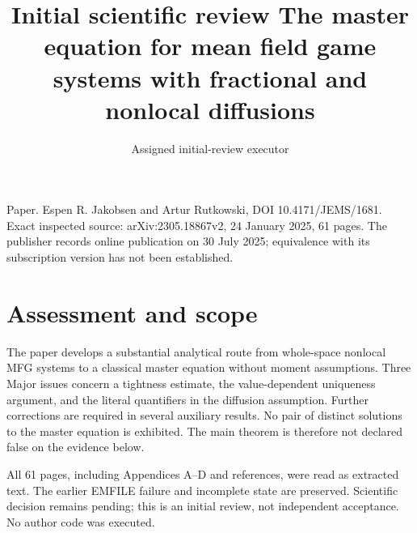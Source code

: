 \documentclass[10pt]{article}
\title{Initial scientific review
The master equation for mean field game systems with fractional and nonlocal diffusions}
\author{Assigned initial-review executor}
\date{}
\begin{document}
\maketitle
Paper. Espen R. Jakobsen and Artur Rutkowski, DOI 10.4171/JEMS/1681. Exact inspected source: arXiv:2305.18867v2, 24 January 2025, 61 pages. The publisher records online publication on 30 July 2025; equivalence with its subscription version has not been established.\par
\section*{Assessment and scope}
The paper develops a substantial analytical route from whole-space nonlocal MFG systems to a classical master equation without moment assumptions. Three Major issues concern a tightness estimate, the value-dependent uniqueness argument, and the literal quantifiers in the diffusion assumption. Further corrections are required in several auxiliary results. No pair of distinct solutions to the master equation is exhibited. The main theorem is therefore not declared false on the evidence below.\par
All 61 pages, including Appendices A–D and references, were read as extracted text. The earlier EMFILE failure and incomplete state are preserved. Scientific decision remains pending; this is an initial review, not independent acceptance. No author code was executed.\par
\end{document}
